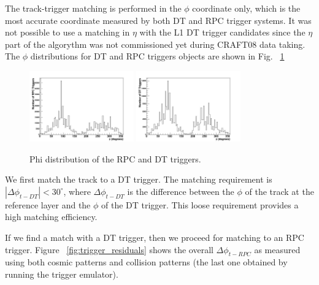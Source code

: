 The track-trigger matching is performed in the $\phi$ coordinate 
only, which is the most accurate coordinate measured by both 
DT and RPC trigger systems. It was not possible to use a matching
in $\eta$ with the L1 DT trigger candidates since the $\eta$ part
of the algorythm was not commissioned yet during CRAFT08 data taking. 
The $\phi$ distributions for DT and
RPC triggers objects are shown in Fig. ~\ref{fig:trigger_eta_phi}

\begin{figure}[hbtp]
  \begin{center}
    \includegraphics[width=0.4\textwidth]{phi_rpc}
    \includegraphics[width=0.4\textwidth]{phi_dt}
      \caption{Phi distribution of the RPC and DT triggers.}
    \label{fig:trigger_eta_phi}
  \end{center}
\end{figure}


We first match the track to a DT trigger.
The matching requirement is $|\Delta\phi_{t-DT}| < 30^\circ$,
where $\Delta\phi_{t-DT}$ is the difference 
between the $\phi$ of the track at the reference layer and
the $\phi$ of the DT trigger. This loose requirement
provides a high matching efficiency.


If we find a match with a DT trigger, then we proceed
for matching to an RPC trigger. 
Figure ~\ref{fig:trigger_residuals} shows the overall $\Delta\phi_{t-RPC}$ as measured 
using both cosmic patterns and collision patterns (the
last one obtained by running the trigger emulator).



